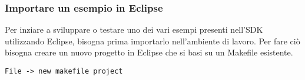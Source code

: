\subsubsection{Importare un esempio in Eclipse}
Per inziare a sviluppare o testare uno dei vari esempi presenti nell'SDK utilizzando Eclipse, bisogna prima importarlo nell'ambiente di lavoro. 
Per fare ciò bisogna creare un nuovo progetto in Eclipse che si basi su un Makefile esistente.

\begin{verbatim}
File -> new makefile project
\end{verbatim}